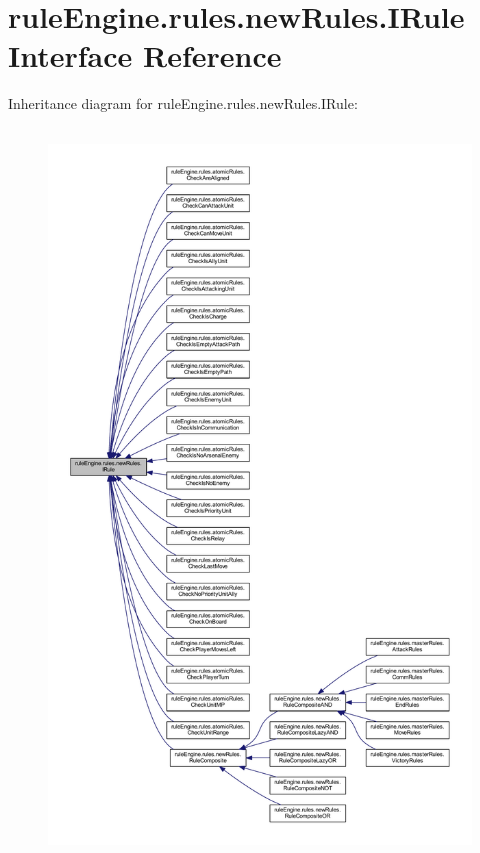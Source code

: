 \hypertarget{interfacerule_engine_1_1rules_1_1new_rules_1_1_i_rule}{}\section{rule\+Engine.\+rules.\+new\+Rules.\+I\+Rule Interface Reference}
\label{interfacerule_engine_1_1rules_1_1new_rules_1_1_i_rule}


Inheritance diagram for rule\+Engine.\+rules.\+new\+Rules.\+I\+Rule\+:
\nopagebreak
\begin{figure}[H]
\begin{center}
\leavevmode
\includegraphics[height=550pt]{interfacerule_engine_1_1rules_1_1new_rules_1_1_i_rule__inherit__graph}
\end{center}
\end{figure}

